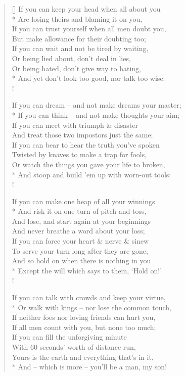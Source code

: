 \documentclass[MAIN]{subfiles}
\begin{document}
\settowidth{\versewidth}{A wet sheet \& a flowing sea}
\begin{verse}[\versewidth]
If you can keep your head when all about you\\*
Are losing theirs and blaming it on you,\\
If you can trust yourself when all men doubt you,\\
But make allowance for their doubting too;\\
If you can wait and not be tired by waiting,\\
Or being lied about, don't deal in lies,\\
Or being hated, don't give way to hating,\\*
And yet don't look too good, nor talk too wise:\\!

If you can dream -- and not make dreams your master;\\*
If you can think -- and not make thoughts your aim;\\
If you can meet with triumph \& disaster\\
And treat those two impostors just the same;\\
If you can bear to hear the truth you've spoken\\
Twisted by knaves to make a trap for fools,\\
Or watch the things you gave your life to broken,\\*
And stoop and build 'em up with worn-out tools:\\!

If you can make one heap of all your winnings\\*
And risk it on one turn of pitch-and-toss,\\
And lose, and start again at your beginnings\\
And never breathe a word about your loss;\\
If you can force your heart \& nerve \& sinew\\
To serve your turn long after they are gone,\\
And so hold on when there is nothing in you\\*
Except the will which says to them, `Hold on!'\\!

If you can talk with crowds and keep your virtue,\\*
Or walk with kings -- nor lose the common touch,\\
If neither foes nor loving friends can hurt you,\\
If all men count with you, but none too much;\\
If you can fill the unforgiving minute\\
With 60 seconds' worth of distance run,\\
Yours is the earth and everything that's in it,\\*
And -- which is more -- you'll be a man, my son!
\end{verse}
\end{document}
